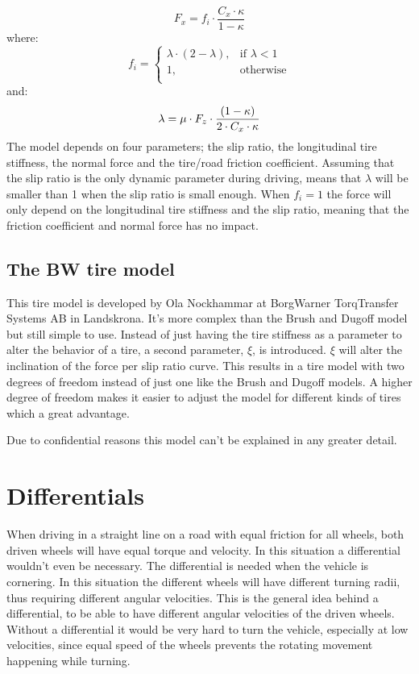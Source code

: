 \begin{equation}
F_{x} = f_{i}\cdot \frac{C_{x} \cdot \kappa}{1-\kappa}
\end{equation}
where:
\begin{equation}
f_{i}=
\begin{cases}
	\lambda\cdot (2-\lambda), & \text{if } \lambda < 1 \\
	1, & \text{otherwise} \\
\end{cases}
\end{equation}
and:
\begin{equation}
	\lambda = \mu \cdot F_{z} \cdot \frac{(1-\kappa)}{2 \cdot C_{x} \cdot \kappa} \\
\end{equation}
The model depends on four parameters; the slip ratio, the longitudinal tire stiffness, the normal force and the tire/road friction coefficient. Assuming that the slip ratio is the only dynamic parameter during driving, means that $ \lambda $ will be smaller than 1 when the slip ratio is small enough. When $ f_{i} = 1 $ the force will only depend on the longitudinal tire stiffness and the slip ratio, meaning that the friction coefficient and normal force has no impact. 

\subsection{The BW tire model}
This tire model is developed by Ola Nockhammar at BorgWarner TorqTransfer Systems AB in Landskrona. It's more complex than the Brush and Dugoff model but still simple to use. Instead of just having the tire stiffness as a parameter to alter the behavior of a tire, a second parameter, $ \xi $, is introduced. $ \xi $ will alter the inclination of the force per slip ratio curve. This results in a tire model with two degrees of freedom instead of just one like the Brush and Dugoff models. A higher degree of freedom makes it easier to adjust the model for different kinds of tires which a great advantage.

Due to confidential reasons this model can't be explained in any greater detail.   

\section{Differentials}
When driving in a straight line on a road with equal friction for all wheels, both driven wheels will have equal torque and velocity. In this situation a differential wouldn't even be necessary. The differential is needed when the vehicle is cornering. In this situation the different wheels will have different turning radii, thus requiring different angular velocities. This is the general idea behind a differential, to be able to have different angular velocities of the driven wheels. Without a differential it would be very hard to turn the vehicle, especially at low velocities, since equal speed of the wheels prevents the rotating movement happening while turning.


